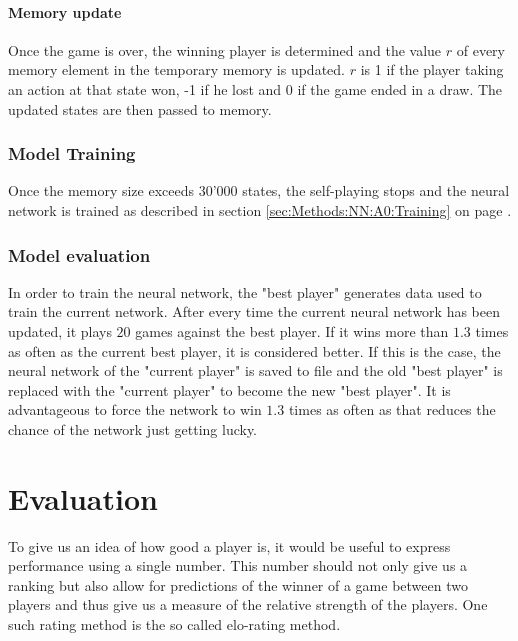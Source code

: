\documentclass[12pt]{article}
\newcommand{\sectionref}[1]{section \ref{#1} on page \pageref{#1}}
\begin{document}
\paragraph{Memory update}
Once the game is over, the winning player is determined and the value \(r\) of every memory element in the temporary memory is updated. \(r\) is 1 if the player taking an action at that state won, -1 if he lost and 0 if the game ended in a draw. The updated states are then passed to memory.

\subsubsection{Model Training}
Once the memory size exceeds 30'000 states, the self-playing stops and the neural network is trained as described in \sectionref{sec:Methods:NN:A0:Training}.

\subsubsection{Model evaluation}\label{sec:modelEvaluation}
In order to train the neural network, the "best player" generates data used to train the current network.
After every time the current neural network has been updated, it plays \(20\) games against the best player. If it wins more than \(1.3\) times as often as the current best player, it is considered better. If this is the case, the neural network of the "current player" is saved to file and the old "best player" is replaced with the "current player" to become the new "best player". It is advantageous to force the network to win \(1.3\) times as often as that reduces the chance of the network just getting lucky. 
\section{Evaluation}
To give us an idea of how good a player is, it would be useful to express performance using a single number. This number should not only give us a ranking but also allow for predictions of the winner of a game between two players and thus give us a measure of the relative strength of the players. One such rating method is the so called elo-rating method. \cite{elo1978rating}
\end{document}
